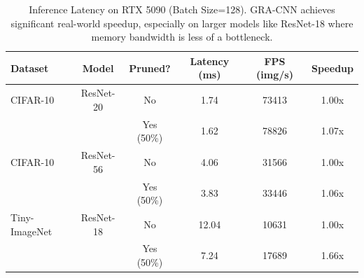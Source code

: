 \begin{table}[t]
\centering
\caption{Inference Latency on RTX 5090 (Batch Size=128). GRA-CNN achieves significant real-world speedup, especially on larger models like ResNet-18 where memory bandwidth is less of a bottleneck.}
\label{tab:latency}
\begin{tabular}{lccccc}
\toprule
Dataset & Model & Pruned? & Latency (ms) & FPS (img/s) & Speedup \\
\midrule
CIFAR-10 & ResNet-20 & No & 1.74 & 73413 & 1.00x \\
 & & Yes (50\%) & 1.62 & 78826 & 1.07x \\
\midrule
CIFAR-10 & ResNet-56 & No & 4.06 & 31566 & 1.00x \\
 & & Yes (50\%) & 3.83 & 33446 & 1.06x \\
\midrule
Tiny-ImageNet & ResNet-18 & No & 12.04 & 10631 & 1.00x \\
 & & Yes (50\%) & 7.24 & 17689 & 1.66x \\
\bottomrule
\end{tabular}
\end{table}
